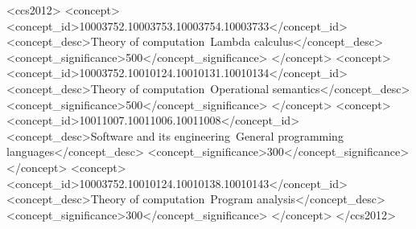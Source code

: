 \begin{CCSXML}
<ccs2012>
<concept>
<concept_id>10003752.10003753.10003754.10003733</concept_id>
<concept_desc>Theory of computation~Lambda calculus</concept_desc>
<concept_significance>500</concept_significance>
</concept>
<concept>
<concept_id>10003752.10010124.10010131.10010134</concept_id>
<concept_desc>Theory of computation~Operational semantics</concept_desc>
<concept_significance>500</concept_significance>
</concept>
<concept>
<concept_id>10011007.10011006.10011008</concept_id>
<concept_desc>Software and its engineering~General programming languages</concept_desc>
<concept_significance>300</concept_significance>
</concept>
<concept>
<concept_id>10003752.10010124.10010138.10010143</concept_id>
<concept_desc>Theory of computation~Program analysis</concept_desc>
<concept_significance>300</concept_significance>
</concept>
</ccs2012>
\end{CCSXML}
